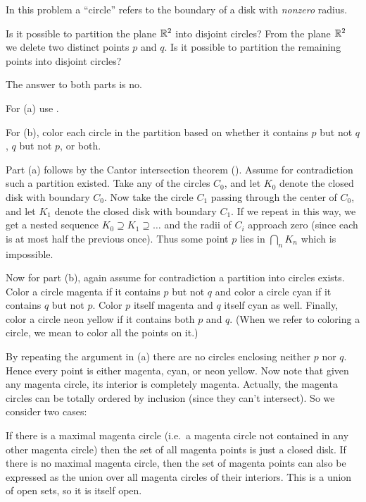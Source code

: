 \begin{problem}
	\yod
	In this problem a ``circle''
	refers to the boundary of a disk with \emph{nonzero} radius.
	\begin{enumerate}[(a)]
		\ii Is it possible to partition the plane $\mathbb R^2$
		into disjoint circles?
		\ii From the plane $\mathbb R^2$ we delete two distinct points $p$ and $q$.
		Is it possible to partition the remaining points into disjoint circles?
	\end{enumerate}
	\begin{hint}
		The answer to both parts is no.

		For (a) use .

		For (b), color each circle in the partition
		based on whether it contains $p$ but not $q$,
		$q$ but not $p$, or both.
	\end{hint}
	\begin{sol}
		Part (a) follows by the Cantor intersection theorem
		().
		Assume for contradiction such a partition existed.
		Take any of the circles $C_0$, and let $K_0$ denote the closed disk
		with boundary $C_0$.
		Now take the circle $C_1$ passing through the center of $C_0$,
		and let $K_1$ denote the closed disk with boundary $C_1$.
		If we repeat in this way,
		we get a nested sequence $K_0 \supseteq K_1 \supseteq \dots$
		and the radii of $C_i$ approach zero
		(since each is at most half the previous once).
		Thus some point $p$ lies in $\bigcap_n K_n$ which is impossible.

		Now for part (b),
		again assume for contradiction a partition into circles exists.
		Color a circle magenta if it contains $p$ but not $q$
		and color a circle cyan if it contains $q$ but not $p$.
		Color $p$ itself magenta and $q$ itself cyan as well.
		Finally, color a circle neon yellow if it contains both $p$ and $q$.
		(When we refer to coloring a circle,
		we mean to color all the points on it.)

		By repeating the argument in (a) there are no circles
		enclosing neither $p$ nor $q$.
		Hence every point is either magenta, cyan, or neon yellow.
		Now note that given any magenta circle,
		its interior is completely magenta.
		Actually, the magenta circles can be totally ordered
		by inclusion (since they can't intersect).
		So we consider two cases:
		\begin{itemize}
		 \ii If there is a maximal magenta circle
		 (i.e.\ a magenta circle not contained in any other magenta circle)
		 then the set of all magenta points is just a closed disk.
		 \ii If there is no maximal magenta circle,
		 then the set of magenta points can also be expressed
		 as the union over all magenta circles of their interiors.
		 This is a union of open sets, so it is itself open.
		 \end{itemize}


\end{sol}
\end{problem}
